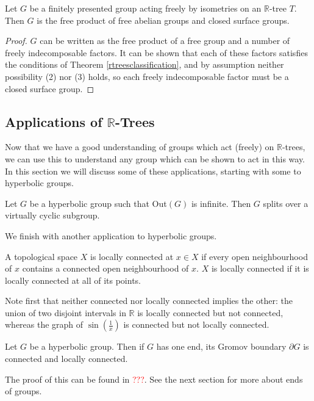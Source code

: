 \begin{theorem}
    Let $G$ be a finitely presented group acting freely by isometries on an $\mathbb{R}$-tree $T$. Then $G$ is the free product of free abelian groups and closed surface groups.
\end{theorem}
\begin{proof}
    $G$ can be written as the free product of a free group and a number of freely indecomposable factors. It can be shown that each of these factors satisfies the conditions of Theorem \ref{rtreesclassification}, and by assumption neither possibility (2) nor (3) holds, so each freely indecomposable factor must be a closed surface group. 
\end{proof}

\subsection{Applications of $\mathbb{R}$-Trees}
Now that we have a good understanding of groups which act (freely) on $\mathbb{R}$-trees, we can use this to understand any group which can be shown to act in this way. In this section we will discuss some of these applications, starting with some to hyperbolic groups.

\begin{theorem}
    Let $G$ be a hyperbolic group such that Out$(G)$ is infinite. Then $G$ splits over a virtually cyclic subgroup.
\end{theorem}

We finish with another application to hyperbolic groups.
\begin{definition}
    A topological space $X$ is \textnormal{locally connected} at $x\in X$ if every open neighbourhood of $x$ contains a connected open neighbourhood of $x$. $X$ is locally connected if it is locally connected at all of its points.
\end{definition}
Note first that neither connected nor locally connected implies the other: the union of two disjoint intervals in $\mathbb{R}$ is locally connected but not connected, whereas the graph of $\sin(\frac{1}{x})$ is connected but not locally connected.

\begin{theorem}
    Let $G$ be a hyperbolic group. Then if $G$ has one end, its Gromov boundary $\partial G$ is connected and locally connected.
\end{theorem}

The proof of this can be found in \textcolor{red}{???}. See the next section for more about ends of groups.




